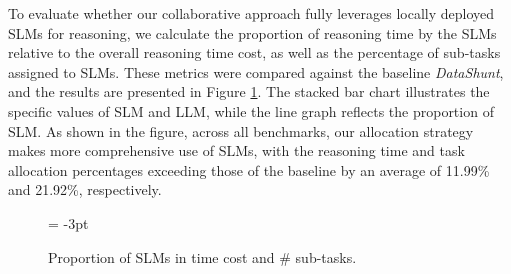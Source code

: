 To evaluate whether our collaborative approach fully leverages locally deployed SLMs for reasoning, we calculate the proportion of reasoning time by the SLMs relative to the overall reasoning time cost, as well as the percentage of sub-tasks assigned to SLMs. These metrics were compared against the baseline \textit{DataShunt}, and the results are presented in Figure \ref{exp: SLM}. 
The stacked bar chart illustrates the specific values of SLM and LLM, while the line graph reflects the proportion of SLM.
As shown in the figure, across all benchmarks, our allocation strategy makes more comprehensive use of SLMs, with the reasoning time and task allocation percentages exceeding those of the baseline by an average of 11.99\% and 21.92\%, respectively.
\vspace{-5mm}
\begin{figure}[h]
    \centering
    \subfigbottomskip = -3pt
    \quad
    \vspace{-5mm} %
    \caption{Proportion of SLMs in time cost and \# sub-tasks.}
    \label{exp: SLM}
    \vspace{-4mm}
\end{figure}




